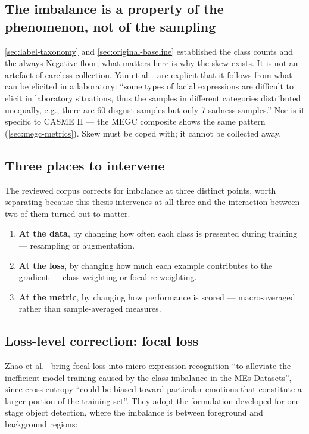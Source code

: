 \subsection{The imbalance is a property of the phenomenon, not of the sampling}
\label{sec:imbalance-property}

\autoref{sec:label-taxonomy} and \autoref{sec:original-baseline} established the class counts and the always-Negative floor; what matters here is why the skew exists. It is not an artefact of careless collection. Yan et al.~\cite{yan2014} are explicit that it follows from what can be elicited in a laboratory: ``some types of facial expressions are difficult to elicit in laboratory situations, thus the samples in different categories distributed unequally, e.g., there are 60 disgust samples but only 7 sadness samples.'' Nor is it specific to CASME II --- the MEGC composite shows the same pattern (\autoref{sec:megc-metrics}). Skew must be coped with; it cannot be collected away.

\subsection{Three places to intervene}
\label{sec:imbalance-three-places}

The reviewed corpus corrects for imbalance at three distinct points, worth separating because this thesis intervenes at all three and the interaction between two of them turned out to matter.

\begin{enumerate}
	\item \textbf{At the data}, by changing how often each class is presented during training --- resampling or augmentation.
	\item \textbf{At the loss}, by changing how much each example contributes to the gradient --- class weighting or focal re-weighting.
	\item \textbf{At the metric}, by changing how performance is scored --- macro-averaged rather than sample-averaged measures.
\end{enumerate}

\subsection{Loss-level correction: focal loss}
\label{sec:imbalance-focal}

Zhao et al.~\cite{zhaoS2021} bring focal loss into micro-expression recognition ``to alleviate the inefficient model training caused by the class imbalance in the MEs Datasets'', since cross-entropy ``could be biased toward particular emotions that constitute a larger portion of the training set''. They adopt the formulation developed for one-stage object detection, where the imbalance is between foreground and background regions:

